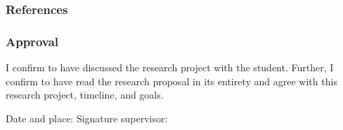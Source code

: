 \documentclass{article}
\begin{document}
\subsubsection*{References}
\vspace{-8.5mm}
\small


\normalsize

\subsubsection*{Approval}
\noindent
I confirm to have discussed the research project with the student. Further, I confirm to have read the research proposal in its entirety and agree with this research project, timeline, and goals. 

\vspace{1.0cm}\noindent
Date and place: \hspace{6cm} Signature supervisor:
\end{document}
